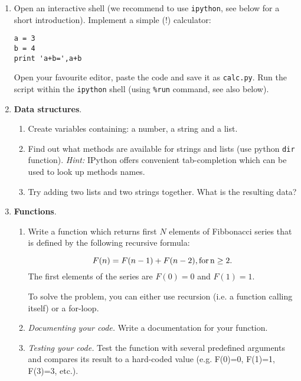\documentclass[12pt, a4]{article}
\begin{document}
\begin{enumerate}
\item  Open an interactive shell (we recommend to use
    \texttt{ipython}, see below for a short introduction). Implement  a simple (!) calculator:
\begin{verbatim}
a = 3
b = 4
print 'a+b=',a+b
\end{verbatim}
Open your favourite editor, paste the code and save it as
\texttt{calc.py}. Run the script within the \texttt{ipython}
shell (using \texttt{\%run} command, see also below).\\

\item \textbf{Data structures}.
    
    \begin{enumerate}
        \item Create variables containing: a number,
    a string and a list. 
        \item Find out what methods are available for strings and
            lists (use python \texttt{dir} function).
            \textit{Hint:}
    IPython offers convenient tab-completion which can be used to look
    up methods names.
         \item Try adding two lists and two strings together. What is
             the resulting data?
\end{enumerate}
\item \textbf{Functions}. 
    
\begin{enumerate} \item  Write a function
    which returns first $N$ elements of Fibbonacci series that
    is defined by the following recursive formula:
            
\begin{equation}
F(n)=F(n-1)+F(n-2),\rm{ for}\, n\geq2. 
\end{equation}
The first elements of the series are $F(0)=0$ and
$F(1)=1$.

To solve the problem, you can either use recursion (i.e. a function calling
itself) or a for-loop.

\item \textit{Documenting your code.} Write a documentation for your
    function.
    
\item \textit{Testing your code.} Test the function with several
    predefined arguments and compares its result to a hard-coded value
    (e.g. F(0)=0, F(1)=1, F(3)=3, etc.).
\end{enumerate}


\end{enumerate}
\end{document}
